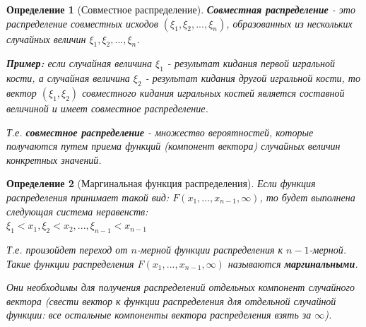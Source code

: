 \documentclass[14pt]{extarticle}
\theoremstyle{breakstyle}
\newtheorem{definition}{Определение}[subsection]
\begin{document}
\begin{definition}[Совместное распределение]

\textbf{Совместная распределение} - это распределение совместных исходов $(\xi_{1}, \xi_{2}, ..., \xi_{n})$, образованных из нескольких случайных величин $\xi_{1}, \xi_{2}, ..., \xi_{n}$.

\vspace{\baselineskip}

\textbf{Пример:} если случайная величина $\xi_{1}$ - результат кидания первой игральной кости, а случайная величина $\xi_{2}$ -  результат кидания другой игральной кости, то вектор $(\xi_{1}, \xi_{2})$ совместного кидания игральных костей является составной величиной и имеет совместное распределение.

\vspace{\baselineskip}

Т.е. \textbf{совместное распределение} - множество вероятностей, которые получаются путем приема функций (компонент вектора) случайных величин конкретных значений.

\end{definition}

\begin{definition}[Маргинальная функция распределения]
Если функция распределения принимает такой вид: $F(x_{1}, ..., x_{n-1}, \infty)$, то будет выполнена следующая система неравенств: \\
$\xi_{1} < x_{1}, \xi_{2} < x_{2}, ..., \xi_{n-1} < x_{n-1}$

\vspace{\baselineskip}

Т.е. произойдет переход от $n$-мерной функции распределения к $n-1$-мерной. Такие функции распределения $F(x_{1}, ..., x_{n-1}, \infty)$ называются \textbf{маргинальными}.

\vspace{\baselineskip}

Они необходимы для получения распределений отдельных компонент случайного вектора (свести вектор к функции распределения для отдельной случайной функции: все остальные компоненты вектора распределения взять за $\infty$).

\end{definition}
\end{document}
